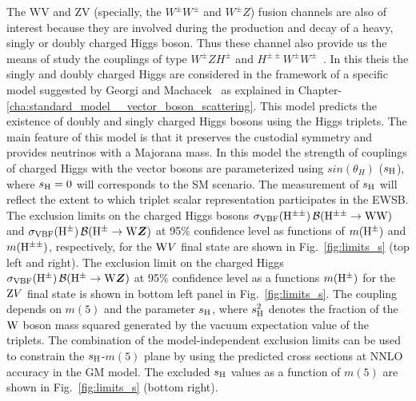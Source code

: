 The WV and ZV (specially, the $W^\pm W^\pm$ and $W^\pm Z$) fusion channels are also of interest because they are involved during the production and decay of a heavy, singly or doubly charged Higgs boson. Thus these channel also provide us the means of study the couplings of type $W^\pm Z H^\pm$ and $H^{\pm \pm}W^\pm W^\pm$~\cite{Vega1990}. In this theis the singly and doubly charged Higgs are considered in the framework of a specific model suggested by Georgi and Machacek~\cite{GEORGI1985463} as explained in Chapter-\ref{cha:standard_model__vector_boson_scattering}. This model predicts the existence of doubly and singly charged Higgs bosons using the Higgs triplets. The main feature of this model is that it preserves the custodial symmetry and provides neutrinos with a Majorana mass. 
In this model the strength of couplings of charged Higgs with the vector bosons are parameterized using $sin(\theta_H)$ ($s_{\mathrm{H}}$), where $s_{\mathrm{H}}=0$ will corresponds to the SM scenario. The measurement of $s_{\mathrm{H}}$ will reflect the extent to which triplet scalar representation participates in the EWSB.
%
The exclusion limits on the charged Higgs bosons $\sigma_\mathrm{VBF}(\mathrm{H^{\pm\pm}}) \, \mathcal{B}(\mathrm{H^{\pm\pm}}\to \mathrm{W}\mathrm{W})$ and $\sigma_\mathrm{VBF}(\mathrm{H}^{\pm}) \, \mathcal{B}(\mathrm{H}^{\pm}\to \mathrm{W}\boldsymbol{Z})$ at 95\% confidence level as functions of $m(\mathrm{H}^{\pm})$ and $m(\mathrm{H^{\pm\pm}})$, respectively, for the $\mathrm{W} V$ final state are shown in Fig.~\ref{fig:limits_s} (top left and right).
The exclusion limit on the charged Higgs $\sigma_\mathrm{VBF}(\mathrm{H}^{\pm}) \, \mathcal{B}(\mathrm{H}^{\pm}\to \mathrm{W}\boldsymbol{Z})$ at 95\% confidence level as a functions $m(\mathrm{H}^{\pm})$ for the $\mathrm{Z} V$ final state is shown in bottom left panel in Fig.~\ref{fig:limits_s}.
The coupling depends on $m(5)$ and the parameter $s_{\mathrm{H}}$, where $s_{\mathrm{H}}^2$ denotes the fraction of the $\mathrm{W}$ boson mass squared generated by the vacuum expectation value of the triplets.
The combination of the model-independent exclusion limits can be used to constrain the $s_{\mathrm{H}}$-$m(5)$ plane by using the predicted cross sections at NNLO accuracy in the GM model.
The excluded $s_{\mathrm{H}}$ values as a function of $m(5)$ are shown in Fig.~\ref{fig:limits_s} (bottom right).

